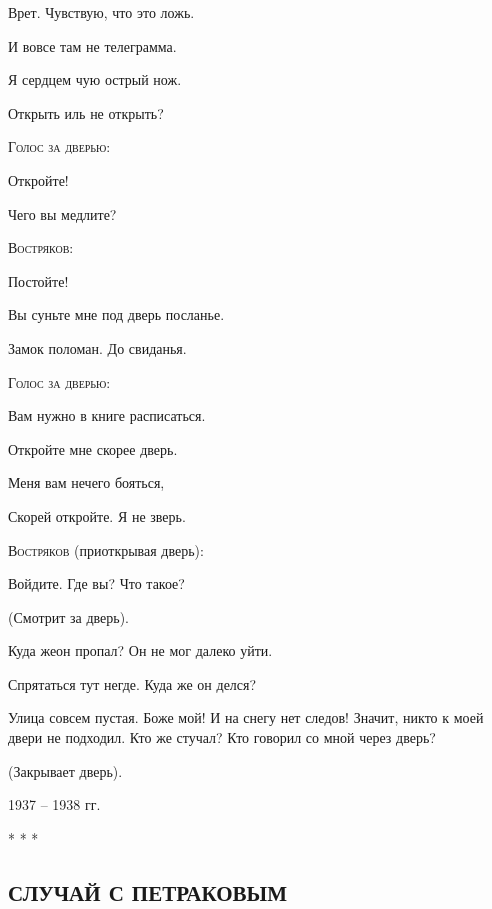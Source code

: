 \documentclass{article}
\begin{document}
   Врет. Чувствую, что это ложь.

   И вовсе там не телеграмма.

   Я сердцем чую острый нож.

   Открыть иль не открыть?

\begin{flushleft}
    \textsc{Голос за дверью:}
\end{flushleft}

   Откройте!

   Чего вы медлите?

\begin{flushleft}
    \textsc{Востряков:} 
\end{flushleft}

   Постойте!

   Вы суньте мне под дверь посланье.

   Замок поломан. До свиданья.
\begin{flushleft}
    \textsc{Голос за дверью:}
\end{flushleft}

   Вам нужно в книге расписаться.

   Откройте мне скорее дверь.

   Меня вам нечего бояться,

   Скорей откройте. Я не зверь.

\begin{flushleft}
    \textsc{Востряков} (приоткрывая дверь):
\end{flushleft}

   Войдите. Где вы? Что такое?

\begin{center}
    (Смотрит за дверь).
\end{center}
               
   Куда жеон пропал?  Он не мог далеко уйти.

   Спрятаться  тут негде.  Куда же он делся?

   Улица совсем пустая. Боже мой! И на снегу
   нет следов! Значит, никто к моей двери не
   подходил.  Кто же стучал?  Кто говорил со
   мной через дверь?

\begin{center}
    (Закрывает дверь).
   \end{center}

\begin{flushright}
    1937 -- 1938 гг.
\end{flushright}
              
\begin{center}
    * * *
\end{center}	
\begin{center}
\section*{СЛУЧАЙ С ПЕТРАКОВЫМ}
\end{center}
\end{document}
